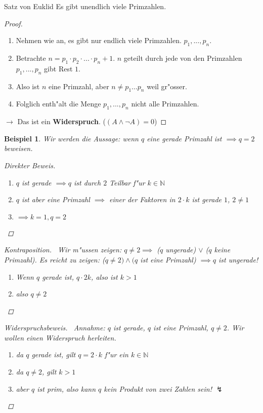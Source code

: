 \documentclass[11pt]{article}
\newtheorem{exa}{Beispiel}[section]
\begin{document}
\begin{theo}{Satz von Euklid}{}
Es gibt unendlich viele Primzahlen.
\end{theo}

\begin{proof}\
\begin{enumerate}
\item Nehmen wie an, es gibt nur endlich viele Primzahlen. \(p_1, ..., p_n\).
\item Betrachte \(n=p_1\cdot p_2\cdot ... \cdot p_n + 1\). \(n\) geteilt durch jede
von den Primzahlen \(p_1, ..., p_n\) gibt Rest \(1\).
\item Also ist \(n\) eine Primzahl, aber \(n\not=p_1 ... p_n\) weil gr"osser.
\item Folglich enth"alt die Menge \({p_1,...,p_n}\) nicht alle Primzahlen.
\end{enumerate}
\indent\indent \(\rightarrow\) Das ist ein \textbf{Widerspruch}. (\((A\wedge \neg A) = 0\))
\end{proof}


\begin{exa}
Wir werden die Aussage: wenn \(q\) eine gerade Primzahl ist \(\implies q=2\)
beweisen.

\begin{proof}[Direkter Beweis] \label{} \
\begin{enumerate}
\item \(q\) ist gerade \(\implies q\) ist durch \(2\) Teilbar f"ur \(k\in\mathbb{N}\)
\item \(q\) ist aber eine Primzahl \(\implies\) einer der Faktoren in \(2\cdot k\) ist
gerade \(1\), \(2\not= 1\)
\item \(\implies k=1, q=2\)
\end{enumerate}
\end{proof}

\begin{proof}[Kontraposition] \label{} \
Wir m"ussen zeigen: \(q\not= 2\implies\) (\(q\) ungerade) \(\vee\) (\(q\) keine
Primzahl). Es reicht zu zeigen: (\(q\not=2)\wedge(q\) ist eine Primzahl)
\(\implies q\) ist ungerade!
\begin{enumerate}
\item Wenn \(q\) gerade ist, \(q\cdot 2k\), also ist \(k>1\)
\item also \(q\not= 2\)
\end{enumerate}
\end{proof}

\begin{proof}[Widerspruchsbeweis] \label{} \
Annahme: \(q\) ist gerade, \(q\) ist eine Primzahl, \(q\not= 2\). Wir wollen einen
Widerspruch herleiten.

\begin{enumerate}
\item da \(q\) gerade ist, gilt \(q=2\cdot k\) f"ur ein \(k\in \mathbb{N}\)
\item da \(q\not= 2\), gilt \(k>1\)
\item aber \(q\) ist prim, also kann \(q\) kein Produkt von zwei Zahlen sein! \(\lightning\)
\end{enumerate}
\end{proof}
\end{exa}
\end{document}
